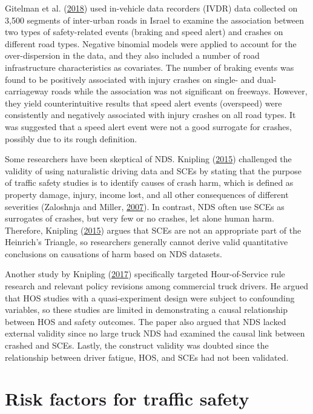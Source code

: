 \documentclass[12pt]{book}
\numberwithin{equation}{chapter}
\begin{document}
Gitelman et al. (\protect\hyperlink{ref-gitelman2018exploring}{2018}) used in-vehicle data recorders (IVDR) data collected on 3,500 segments of inter-urban roads in Israel to examine the association between two types of safety-related events (braking and speed alert) and crashes on different road types. Negative binomial models were applied to account for the over-dispersion in the data, and they also included a number of road infrastructure characteristics as covariates. The number of braking events was found to be positively associated with injury crashes on single- and dual-carriageway roads while the association was not significant on freeways. However, they yield counterintuitive results that speed alert events (overspeed) were consistently and negatively associated with injury crashes on all road types. It was suggested that a speed alert event were not a good surrogate for crashes, possibly due to its rough definition.

Some researchers have been skeptical of NDS. Knipling (\protect\hyperlink{ref-knipling2015naturalistic}{2015}) challenged the validity of using naturalistic driving data and SCEs by stating that the purpose of traffic safety studies is to identify causes of crash harm, which is defined as property damage, injury, income lost, and all other consequences of different severities (Zaloshnja and Miller, \protect\hyperlink{ref-zaloshnja2007unit}{2007}). In contrast, NDS often use SCEs as surrogates of crashes, but very few or no crashes, let alone human harm. Therefore, Knipling (\protect\hyperlink{ref-knipling2015naturalistic}{2015}) argues that SCEs are not an appropriate part of the Heinrich's Triangle, so researchers generally cannot derive valid quantitative conclusions on causations of harm based on NDS datasets.

Another study by Knipling (\protect\hyperlink{ref-knipling2017threats}{2017}) specifically targeted Hour-of-Service rule research and relevant policy revisions among commercial truck drivers. He argued that HOS studies with a quasi-experiment design were subject to confounding variables, so these studies are limited in demonstrating a causal relationship between HOS and safety outcomes. The paper also argued that NDS lacked external validity since no large truck NDS had examined the causal link between crashed and SCEs. Lastly, the construct validity was doubted since the relationship between driver fatigue, HOS, and SCEs had not been validated.

\hypertarget{risk-factors-for-traffic-safety}{%
\section{Risk factors for traffic safety}\label{risk-factors-for-traffic-safety}}
\end{document}
